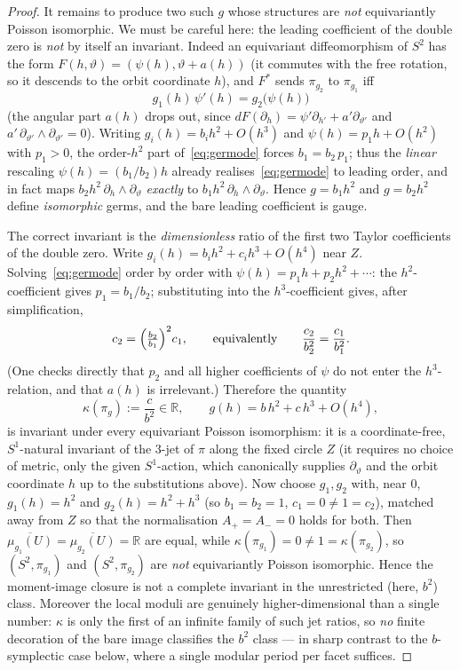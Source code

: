 \documentclass{amsart}
\theoremstyle{definition}
\begin{document}
\begin{proof}
It remains to produce two such $g$ whose structures are \emph{not} equivariantly
Poisson isomorphic. We must be careful here: the leading coefficient of the
double zero is \emph{not} by itself an invariant. Indeed an equivariant
diffeomorphism of $S^2$ has the form $F(h,\vartheta)=(\psi(h),\vartheta+a(h))$
(it commutes with the free rotation, so it descends to the orbit coordinate
$h$), and $F^*$ sends $\pi_{g_2}$ to $\pi_{g_1}$ iff
\begin{equation}\label{eq:germode}
g_1(h)\,\psi'(h)=g_2\bigl(\psi(h)\bigr)
\end{equation}
(the angular part $a(h)$ drops out, since $dF(\partial_h)=\psi'\partial_{h'}+
a'\partial_{\vartheta'}$ and $a'\,\partial_{\vartheta'}\wedge\partial_{\vartheta'}
=0$). Writing $g_i(h)=b_i h^2+O(h^3)$ and $\psi(h)=p_1h+O(h^2)$ with $p_1>0$,
the order-$h^2$ part of~\eqref{eq:germode} forces $b_1=b_2\,p_1$; thus the
\emph{linear} rescaling $\psi(h)=(b_1/b_2)h$ already realises~\eqref{eq:germode}
to leading order, and in fact maps $b_2h^2\,\partial_h\wedge\partial_\vartheta$
\emph{exactly} to $b_1h^2\,\partial_h\wedge\partial_\vartheta$. Hence
$g=b_1h^2$ and $g=b_2h^2$ define \emph{isomorphic} germs, and the bare leading
coefficient is gauge.

The correct invariant is the \emph{dimensionless} ratio of the first two
Taylor coefficients of the double zero. Write $g_i(h)=b_ih^2+c_ih^3+O(h^4)$ near
$Z$. Solving~\eqref{eq:germode} order by order with $\psi(h)=p_1h+p_2h^2+\cdots$:
the $h^2$-coefficient gives $p_1=b_1/b_2$; substituting into the
$h^3$-coefficient gives, after simplification,
\[
c_2=\Bigl(\tfrac{b_2}{b_1}\Bigr)^{2}c_1,\qquad\text{equivalently}\qquad
\frac{c_2}{b_2^{2}}=\frac{c_1}{b_1^{2}} .
\]
(One checks directly that $p_2$ and all higher coefficients of $\psi$ do not
enter the $h^3$-relation, and that $a(h)$ is irrelevant.) Therefore the
quantity
\[
\kappa(\pi_g):=\frac{c}{b^{2}}\in\mathbb R,\qquad g(h)=b\,h^2+c\,h^3+O(h^4),
\]
is invariant under every equivariant Poisson isomorphism: it is a
coordinate-free, $S^1$-natural invariant of the $3$-jet of $\pi$ along the fixed
circle $Z$ (it requires no choice of metric, only the given $S^1$-action, which
canonically supplies $\partial_\vartheta$ and the orbit coordinate $h$ up to the
substitutions above). Now choose $g_1,g_2$ with, near $0$,
$g_1(h)=h^2$ and $g_2(h)=h^2+h^3$ (so $b_1=b_2=1$, $c_1=0\neq1=c_2$), matched
away from $Z$ so that the normalisation $A_+=A_-=0$ holds for both. Then
$\overline{\mu_{g_1}(U)}=\overline{\mu_{g_2}(U)}=\mathbb R$ are equal, while
$\kappa(\pi_{g_1})=0\neq1=\kappa(\pi_{g_2})$, so $(S^2,\pi_{g_1})$ and
$(S^2,\pi_{g_2})$ are \emph{not} equivariantly Poisson isomorphic. Hence the
moment-image closure is not a complete invariant in the unrestricted (here,
$b^2$) class. Moreover the local moduli are genuinely higher-dimensional than a
single number: $\kappa$ is only the first of an infinite family of such jet
ratios, so \emph{no} finite decoration of the bare image classifies the
$b^2$ class --- in sharp contrast to the $b$-symplectic case below, where a
single modular period per facet suffices.


\end{proof}
\end{document}
